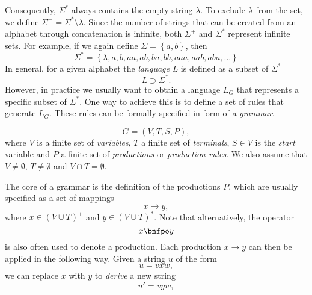 Consequently, $\Sigma^*$ always contains the empty string $\lambda$.
To exclude $\lambda$ from the set, we define $\Sigma^+ = \Sigma^* \setminus \lambda$.
Since the number of strings that can be created from an alphabet through concatenation is infinite, both $\Sigma^+$ and $\Sigma^*$ represent infinite sets.
For example, if we again define $\Sigma = \left\{a, b\right\}$, then
\begin{equation*}
	\Sigma^{*} = \left\{\lambda, a, b, aa, ab, ba, bb, aaa, aab, aba, \dots \right\}
\end{equation*} 
In general, for a given alphabet the \emph{language} $L$ is defined as a subset of $\Sigma^*$
\begin{equation}
	L \supset \Sigma^*.
	\label{eq:language-basic-definition}
\end{equation}
However, in practice we usually want to obtain a language $L_G$ that represents a specific subset of $\Sigma^*$.
One way to achieve this is to define a set of rules that generate $L_G$.
These rules can be formally specified in form of a \emph{grammar}.
\begin{definition}[Grammar]
	\begin{equation*}
		G = \left(V, T, S, P \right),
	\end{equation*}
	where $V$ is a finite set of \emph{variables},
	$T$ a finite set of \emph{terminals},
	$S \in V$ is the \emph{start} variable and 
	$P$ a finite set of \emph{productions} or \emph{production rules}.
	We also assume that $V \neq \emptyset$, $T \neq \emptyset$ and $V \cap T = \emptyset$.
\end{definition}
The core of a grammar is the definition of the productions $P$, which are usually specified as a set of mappings
\begin{equation}
	x \to y,
	\label{eq:unrestricted-production}
\end{equation}
where $x \in \left(V \cup T\right)^+$ and $y \in \left(V \cup T\right)^*$.
Note that alternatively, the operator
\begin{equation*}
	x \bnfpo y
\end{equation*}
is also often used to denote a production.
Each production $x \to y$ can then be applied in the following way.
Given a string $u$ of the form 
\begin{equation}
	u = vxw,
\end{equation}
we can replace $x$ with $y$ to \emph{derive} a new string
\begin{equation}
	u' = vyw,
\end{equation}
